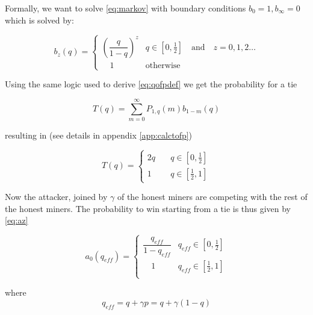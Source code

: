 \documentclass[letterpaper,12pt]{report}
\theoremstyle{plain}
\theoremstyle{definition}
\begin{document}
Formally, we want to solve \ref{eq:markov} with boundary conditions $b_0=1, b_\infty=0$ which is solved by:

\begin{equation}\label{eq:bz}
\mathit{b}_z(q)=\begin{cases}\left( \dfrac{q}{1-q}\right)^z & q\in [0,\frac{1}{2}] \quad \mathrm{and} \quad z=0,1,2\dots \\ \quad 1 & \mathrm{otherwise} \end{cases}
\end{equation}

Using the same logic used to derive \ref{eq:qofpdef} we get the probability for a tie

\begin{equation}\label{eq:qofpdef}
\mathit{T}(q)= \sum_{m=0}^{\infty}\mathit{P}_{1,q}(m)\mathit{b}_{1-m}(q)
\end{equation}

resulting in (see details in appendix \ref{app:calctofp})

\begin{equation}\label{eq:qofp}
\mathit{T}(q)=
\begin{cases}
2q & \quad q \in [0,\frac{1}{2}] \\
1 & \quad q \in [\frac{1}{2},1] 
\end{cases}
\end{equation}

Now the attacker, joined by $\gamma$ of the honest miners are competing with the rest of the honest miners. The probability to win starting from a tie is thus given by \ref{eq:az}

\begin{equation}\label{eq:azeroeff}
\mathit{a}_0(q_{eff})=\begin{cases} \dfrac{q_{eff}}{1-q_{eff}} & q_{eff}\in [0,\frac{1}{2}] \\  
\quad 1 & q_{eff}\in [\frac{1}{2},1] \\ \end{cases}
\end{equation}

where 
\begin{equation}\label{qeff}
q_{eff}=q+\gamma p=q+\gamma(1-q)
\end{equation}
\end{document}
